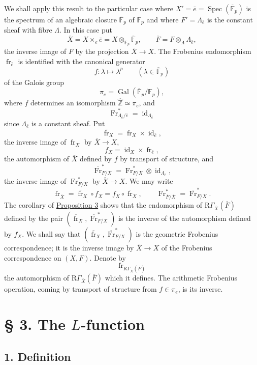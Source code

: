 \documentclass[11pt]{article}
\DeclareMathOperator{\Spec}{Spec}
\providecommand{\Gal}{\operatorname{Gal}}
\providecommand{\RGamma}{\mathrm R\Gamma}
\providecommand{\id}{\operatorname{id}}
\providecommand{\id}{\operatorname{id}}
\providecommand{\id}{\operatorname{id}}
\providecommand{\RGamma}{\mathrm R\Gamma}
\providecommand{\id}{\operatorname{id}}
\providecommand{\Spec}{\operatorname{Spec}}
\providecommand{\Spec}{\operatorname{Spec}}
\providecommand{\id}{\operatorname{id}}
\providecommand{\Spec}{\operatorname{Spec}}
\providecommand{\fr}{\operatorname{fr}}
\providecommand{\Fr}{\operatorname{Fr}}
\providecommand{\Fr}{\operatorname{Fr}}
\providecommand{\fr}{\operatorname{fr}}
\providecommand{\Spec}{\operatorname{Spec}}
\providecommand{\id}{\operatorname{id}}
\providecommand{\RGamma}{\mathrm R\Gamma}
\providecommand{\Gal}{\operatorname{Gal}}
\begin{document}
We shall apply this result to the particular case where
$X'=\bar e=\Spec(\overline{\mathbb F}_p)$ is the spectrum of an
algebraic closure $\overline{\mathbb F}_p$ of $\mathbb F_p$ and where
$F'=\Lambda_{\bar e}$ is the constant sheaf with fibre $\Lambda$.
In this case put
\[
\overline X=X\times_e\bar e
=X\otimes_{\mathbb F_p}\overline{\mathbb F}_p,
\qquad
\overline F=F\otimes_\Lambda\Lambda_{\bar e},
\]
the inverse image of $F$ by the projection $\overline X\to X$.
The Frobenius endomorphism $\fr_{\bar e}$ is identified with the
canonical generator
\[
f:\lambda\longmapsto\lambda^p
\qquad(\lambda\in\overline{\mathbb F}_p)
\]
of the Galois group
\[
\pi_e=\Gal(\overline{\mathbb F}_p/\mathbb F_p),
\]
where $f$ determines an isomorphism
$\widehat{\mathbb Z}\simeq\pi_e$, and
\[
\Fr^*_{\Lambda_{\bar e}/\bar e}=\id_{\Lambda_{\bar e}}
\]
since $\Lambda_{\bar e}$ is a constant sheaf. Put
\[
\overline{\fr}_X=\fr_X\times\id_{\bar e},
\]
the inverse image of $\fr_X$ by $\overline X\to X$,
\[
f_X=\id_X\times\fr_{\bar e},
\]
the automorphism of $\overline X$ defined by $f$ by transport of
structure, and
\[
\overline{\Fr}^*_{F/X}
=\Fr^*_{F/X}\otimes\id_{\Lambda_{\bar e}},
\]
the inverse image of $\Fr^*_{F/X}$ by $\overline X\to X$. We may write
\[
\fr_{\overline X}
=\overline{\fr}_X\circ f_X
=f_X\circ\overline{\fr}_X,
\qquad
\Fr^*_{\overline F/\overline X}
=\overline{\Fr}^*_{F/X}.
\]
The corollary of \hyperref[sga5:XV:proposition:3]{Proposition 3} shows that the endomorphism of
$\RGamma_{\overline X}(\overline F)$ defined by the pair
$(\overline{\fr}_X,\overline{\Fr}^*_{F/X})$ is the inverse of the
automorphism defined by $f_X$. We shall say that
$(\overline{\fr}_X,\overline{\Fr}^*_{F/X})$ is the geometric
Frobenius correspondence; it is the inverse image by
$\overline X\to X$ of the Frobenius correspondence on $(X,F)$. Denote by
\[
\fr_{\RGamma_{\overline X}(\overline F)}
\]
the automorphism of $\RGamma_{\overline X}(\overline F)$ which it
defines. The arithmetic Frobenius operation, coming by transport of
structure from $f\in\pi_e$, is its inverse.

\section*{§ 3. The $L$-function}

\subsection*{1. Definition}\label{sga5:XV:subsection:1:2}
\end{document}
